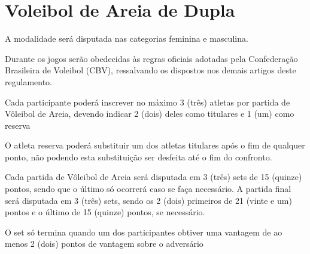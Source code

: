{\let\clearpage\relax \chapter{Voleibol de Areia de Dupla}}

\begin{article}
	A modalidade será disputada nas categorias feminina e masculina.
\end{article}

\begin{article}
	Durante os jogos serão obedecidas às regras oficiais adotadas pela Confederação Brasileira de Voleibol (CBV), ressalvando os dispostos nos demais artigos deste regulamento.
\end{article}

\begin{article}
	Cada participante poderá inscrever no máximo 3 (três) atletas por partida de Vôleibol de Areia, devendo indicar 2 (dois) deles como titulares e 1 (um) como reserva

	\begin{xparagraph}
		O atleta reserva poderá substituir um dos atletas titulares após o fim de qualquer ponto, não podendo esta substituição ser desfeita até o fim do confronto.
	\end{xparagraph}
\end{article}

\begin{article}
	Cada partida de Vôleibol de Areia será disputada em 3 (três) sets de 15 (quinze) pontos, sendo que o último só ocorrerá caso se faça necessário. A partida final será disputada em 3 (três) sets, sendo os 2 (dois) primeiros de 21 (vinte e um) pontos e o último de 15 (quinze) pontos, se necessário.

	\begin{xparagraph}
		O set só termina quando um dos participantes obtiver uma vantagem de ao menos 2 (dois) pontos de vantagem sobre o adversário
	\end{xparagraph}
\end{article}
